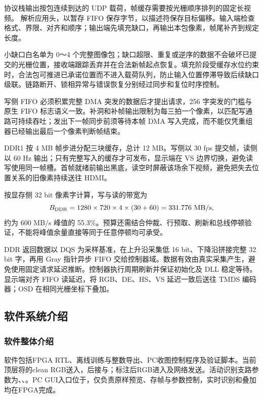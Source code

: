 协议栈输出按包连续到达的 UDP 载荷，帧缓存需要按光栅顺序排列的固定长视频。 解析应用头，以暂存 FIFO 保存字节，以描述符保存目标偏移。输入端检查格式、界限、对齐和顺序；输出端先填充缺口，再输出本包像素，帧尾补齐到规定长度。

小缺口白名单为 0～4 个完整图像包；缺口超限、重复或逆序的数据不会破坏已提交的光栅位置，接收端跟踪丢弃并在合法新帧起点恢复。填充阶段受缓存水位约束时，合法包可推进已承诺位置而不进入载荷队列，防止输入位置停滞导致后续缺口级联。链路断开、锁相异常与错误恢复分别经过同步和复位时序控制。

写侧 FIFO 必须积累完整 DMA 突发的数据后才提出请求，256 字突发的门槛与原生 FIFO 标志语义一致。补洞和补帧输出限制为每三拍一个像素，以匹配写通路可持续吞吐；发出下一帧同步前须等待本帧 DMA 写入完成，而不能仅凭重组器已经输出最后一个像素判断帧结束。\cite{hdmistart,hdmicolor}

DDR1 按 4 MB 帧步进分配三块缓存，总计 12 MB。写侧以 30 fps 提交帧，读侧以 60 Hz 输出；只有完整写入的缓存才可发布，显示端在 VS 边界切换，避免读写使用同一帧槽。首帧就绪前输出黑底，读空时屏蔽该场余下视频，避免把失去位置关系的旧像素持续送往 HDMI。

按显存侧 32 bit 像素字计算，写与读的带宽为
\begin{equation}
B_{\rm DDR}=1280\times720\times4\times(30+60)
 =331.776\ \mathrm{MB/s},
\end{equation}
约为 600 MB/s 峰值的 55.3\%。预算还需结合仲裁、行预取、刷新和总线停顿验证，不能将峰值余量直接等同于任意停顿均可承受。

DDR 返回数据以 DQS 为采样基准，在上升沿采集低 16 bit、下降沿拼接完整 32 bit 字，再用 Gray 指针异步 FIFO 交给控制器域。数据有效由真实采集产生，避免使用固定请求延迟推断。控制器执行周期刷新并保证初始化及 DLL 稳定等待。显示端对齐 FIFO 读延迟，将 RGB、DE、HS、VS 延迟一致后送往 TMDS 编码器；OSD 在相同光栅坐标下叠加。\cite{hdmicolor}

\subsection{软件系统介绍}
\subsubsection{软件整体介绍}
软件包括FPGA RTL、离线训练与整数导出、PC收图控制程序及验证脚本。当前顶层将的clean RGB送入，后接与；标注后RGB进入及网络发送。活动识别支路参数为、、。PC GUI入口位于，仅负责原样预览、存帧与参数控制，实时识别和叠加均在FPGA完成。

